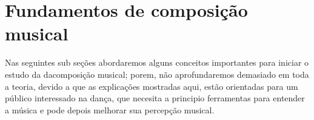 
\chapter{Fundamentos de composição musical}
Nas seguintes sub seções abordaremos alguns conceitos importantes para iniciar o estudo da dacomposição musical;
porem, não aprofundaremos demasiado em toda a teoria, 
devido a que as explicações mostradas aqui, estão
orientadas para um público interessado na dança, que necesita a principio
ferramentas para entender a música e pode depois melhorar sua percepção musical. 


 
 
 


 



 

 

  
% 

  


